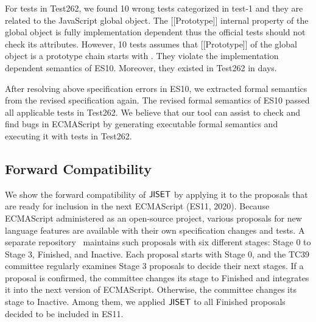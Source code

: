 For tests in Test262, we found 10 wrong tests categorized in test-1 and they are
related to the JavaScript global object. The [[Prototype]] internal property of
the global object is fully implementation dependent thus the official tests
should not check its attributes.  However, 10 tests assumes that [[Prototype]]
of the global object is a prototype chain starts with .
They violate the implementation dependent semantics of ES10.  Moreover, they
existed in Test262 in  days.

After resolving above specification errors in ES10, we extracted formal
semantics from the revised specification again. The revised formal semantics of
ES10 passed all  applicable tests in Test262.  We believe that our
tool can assist to check and find bugs in ECMAScript by generating executable
formal semantics and executing it with tests in Test262.


\subsection{Forward Compatibility}

We show the forward compatibility of \( \text{\sf JISET} \) by applying it to the proposals
that are ready for inclusion in the next ECMAScript (ES11, 2020). Because
ECMAScript administered as an open-source project, various proposals for new
language features are available with their own specification changes and tests.
A separate repository~\cite{proposals} maintains such proposals with six
different stages: Stage 0 to Stage 3, Finished, and Inactive.  Each proposal
starts with Stage 0, and the TC39 committee regularly examines Stage 3 proposals
to decide their next stages.  If a proposal is confirmed, the committee changes
its stage to Finished and integrates it into the next version of ECMAScript.
Otherwise, the committee changes its stage to Inactive.  Among them, we applied
\( \text{\sf JISET} \) to all Finished proposals decided to be included in ES11.

